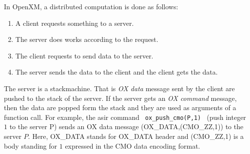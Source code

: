 In OpenXM, a distributed computation is done as follows:
\begin{enumerate}
\item A client requests something to a server.
\item The server does works according to the request.
\item The client requests to send data to the server.
\item The server sends the data to the client and the client gets the data.
\end{enumerate}
The server is a stackmachine. 
That is {\it OX data} message sent by the client
are pushed to the stack of the server. 
If the server gets an {\it OX command} message, then the data are
popped form the stack and they are used as arguments of a function call.
For example, the asir command
\verb+ ox_push_cmo(P,1) + (push integer $1$ to the server P)
sends an OX data message
(OX\_DATA,(CMO\_ZZ,1)) to the server $P$.
Here,
OX\_DATA stands for OX\_DATA header and 
(CMO\_ZZ,1) is a body standing for $1$ expressed 
in the CMO data encoding format.






